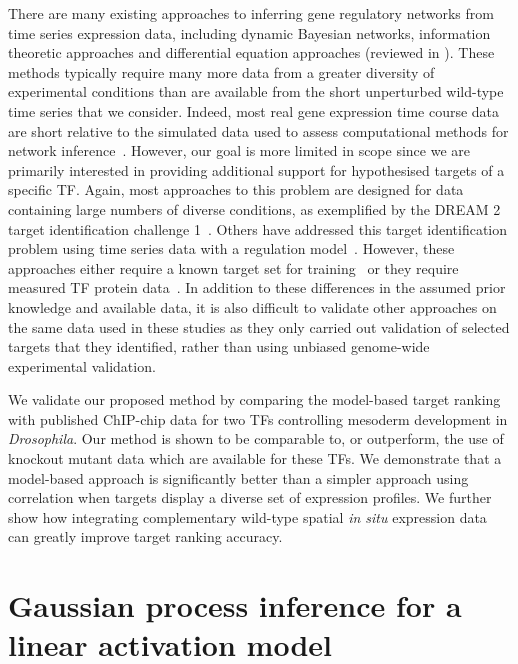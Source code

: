 \documentclass{pnastwo}
\begin{document}
\begin{article}
There are many existing approaches to inferring gene regulatory networks from
time series expression data, including dynamic Bayesian networks,
information theoretic approaches and differential equation approaches
(reviewed in \cite{Bansal2007a}). These methods typically require many
more data from a greater diversity of experimental conditions than are
available from the short unperturbed wild-type time series that we
consider. Indeed, most real gene expression time course data are short
relative to the simulated data used to assess computational methods
for network inference~\cite{Ernst2005}. However, our goal is more limited in scope since
we are primarily interested in providing additional support for hypothesised
targets of a specific TF. Again, most approaches to this problem are
designed for data containing large numbers of diverse conditions, as
exemplified by the DREAM 2 target identification
challenge 1~\cite{Stolovitzky2007}. Others
have addressed this target identification problem using time series
data with a regulation model~\cite{Barenco2006a,Gatta2008}. However,
these approaches either require a known target set for training~\cite{Barenco2006a} or
they require measured TF protein data~\cite{Gatta2008}. In addition to
these differences in the assumed prior knowledge and available data,
it is also difficult to validate other approaches on the same data used in these
studies as they only carried out validation of selected targets
that they identified, rather than using unbiased genome-wide
experimental validation. 

We validate our proposed method by comparing the model-based target
ranking with published ChIP-chip data for two TFs controlling
mesoderm development in \emph{Drosophila}. Our method is shown to be comparable
to, or outperform, the use of knockout mutant data which are available
for these TFs. We demonstrate that a model-based approach is significantly
better than a simpler approach using correlation when targets display a diverse set of expression profiles. We further show how integrating complementary wild-type spatial
{\em in situ} expression data can greatly improve target ranking accuracy. 

\section{Gaussian process inference for a linear activation model}


\end{article}
\end{document}
